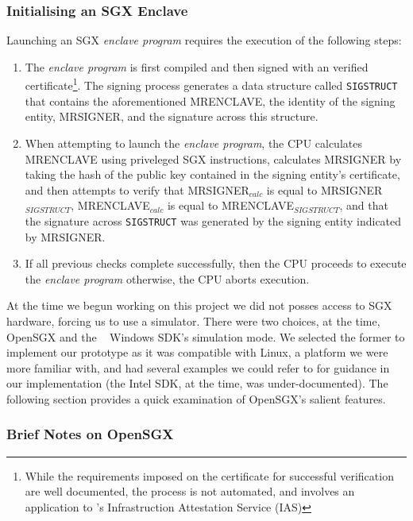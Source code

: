 \documentclass[../main.tex]{subfiles}
\begin{document}
\subsubsection{Initialising an SGX Enclave}

Launching an SGX \textit{enclave program} requires the execution of
the following steps:

\begin{enumerate}
  \item The \textit{enclave program} is first compiled and then signed
    with an \Intel verified certificate\footnote{While the requirements
    imposed on the certificate for successful verification are well
    documented, the process is not automated, and involves an application
    to \Intel's Infrastruction Attestation Service (IAS)}. The signing
    process generates a data structure called \texttt{SIGSTRUCT} that
    contains the aforementioned MRENCLAVE, the identity of the signing
    entity, MRSIGNER, and the signature across this structure.
  \item When attempting to launch the \textit{enclave program}, the
    CPU calculates MRENCLAVE using priveleged SGX instructions, calculates
    MRSIGNER by taking the hash of the public key contained in the signing
    entity's certificate, and then attempts to verify that
    MRSIGNER$_{calc}$ is equal to MRSIGNER$_{SIGSTRUCT}$,
    MRENCLAVE$_{calc}$ is equal to MRENCLAVE$_{SIGSTRUCT}$, and that the
    signature across \texttt{SIGSTRUCT} was generated by the signing
    entity indicated by MRSIGNER.
  \item If all previous checks complete successfully, then the CPU
    proceeds to execute the \textit{enclave program} otherwise, the CPU
    aborts execution.
\end{enumerate}

At the time we begun working on this project we did not posses access
to SGX hardware, forcing us to use a simulator. There were two
choices, at the time, OpenSGX and the \Intel~ Windows SDK's simulation
mode. We selected the former to implement our prototype as it was
compatible with Linux, a platform we were more familiar with, and had
several examples we could refer to for guidance in our implementation
(the Intel SDK, at the time, was under-documented). The following
section provides a quick examination of OpenSGX's salient features.


\subsubsection{Brief Notes on OpenSGX}

\end{document}
